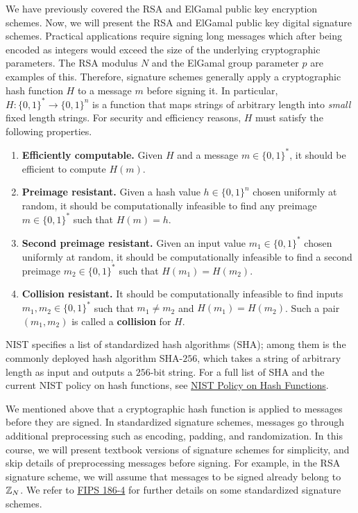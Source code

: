 We have previously covered the RSA and ElGamal public key encryption schemes. 
Now, we will present the RSA and ElGamal public key digital signature schemes. 
Practical applications require signing long messages which after being encoded as 
integers would exceed the size of the underlying cryptographic parameters. 
The RSA modulus $N$ and the ElGamal group parameter $p$ are examples of this. 
Therefore, signature schemes generally apply a cryptographic hash function 
$H$ to a message $m$ before signing it. In particular, $H : \{0, 1\}^* 
\to \{0, 1\}^n$ is a function that maps strings of arbitrary length into 
\emph{small} fixed length strings. For security and efficiency reasons, 
$H$ must satisfy the following properties. 
\begin{enumerate}
    \item \textbf{Efficiently computable.} Given $H$ and a message $m \in \{0, 1\}^*$, 
          it should be efficient to compute $H(m)$. 
    \item \textbf{Preimage resistant.} Given a hash value $h \in \{0, 1\}^n$ 
          chosen uniformly at random, it should be computationally infeasible 
          to find any preimage $m \in \{0, 1\}^*$ such that $H(m) = h$. 
    \item \textbf{Second preimage resistant.} Given an input value $m_1 \in \{0, 1\}^*$
          chosen uniformly at random, it should be computationally infeasible 
          to find a second preimage $m_2 \in \{0, 1\}^*$ such that $H(m_1) = H(m_2)$. 
    \item \textbf{Collision resistant.} It should be computationally infeasible 
          to find inputs $m_1, m_2 \in \{0, 1\}^*$ such that $m_1 \neq m_2$ and 
          $H(m_1) = H(m_2)$. Such a pair $(m_1, m_2)$ is called a \textbf{collision} 
          for $H$. 
\end{enumerate}
NIST specifies a list of standardized hash algorithms (SHA); among them is 
the commonly deployed hash algorithm SHA-$256$, which takes a string of 
arbitrary length as input and outputs a $256$-bit string. For a full list of 
SHA and the current NIST policy on hash functions, see 
\href{https://csrc.nist.gov/Projects/Hash-Functions/NIST-Policy-on-Hash-Functions}
{NIST Policy on Hash Functions}. 

\begin{remark}
    We mentioned above that a cryptographic hash function is applied to messages 
    before they are signed. In standardized signature schemes, messages go 
    through additional preprocessing such as encoding, padding, and 
    randomization. In this course, we will present textbook versions of 
    signature schemes for simplicity, and skip details of preprocessing 
    messages before signing. For example, in the RSA signature scheme, 
    we will assume that messages to be signed already belong to $\mathbb{Z}_N$. 
    We refer to \href{https://nvlpubs.nist.gov/nistpubs/FIPS/NIST.FIPS.186-4.pdf}
    {FIPS 186-4} for further details on some standardized
    signature schemes. 
\end{remark}

